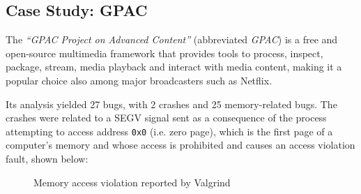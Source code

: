 \newpage
\subsection{Case Study: GPAC}
The \textit{``GPAC Project on Advanced Content''} (abbreviated \textit{GPAC}) \cite{gpac} is a free and open-source multimedia framework that provides tools to process, inspect, package, stream, media playback and interact with media content, making it a popular choice also among major broadcasters such as Netflix.

Its analysis yielded 27 bugs, with 2 crashes and 25 memory-related bugs.
The crashes were related to a SEGV signal sent as a consequence of the process attempting to access address \verb|0x0| (i.e. zero page), which is the first page of a computer's memory and whose access is prohibited and causes an access violation fault, shown below:
\begin{figure}[h]
\caption{Memory access violation reported by Valgrind}
\label{fig:segv_gpac}
\end{figure}
\ \\

